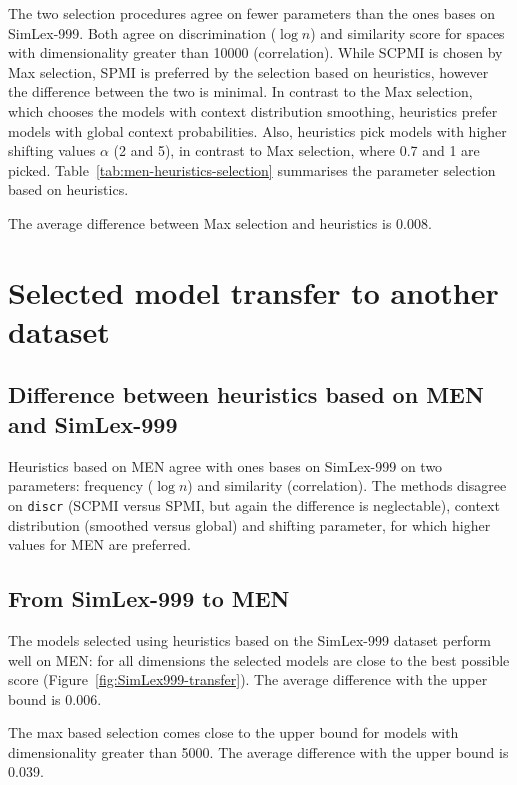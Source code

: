 The two selection procedures agree on fewer parameters than the ones bases on SimLex-999. Both agree on discrimination ($\log n$) and similarity score for spaces with dimensionality greater than 10000 (correlation). While SCPMI is chosen by Max selection, SPMI is preferred by the selection based on heuristics, however the difference between the two is minimal. In contrast to the Max selection, which chooses the models with context distribution smoothing, heuristics prefer models with global context probabilities. Also, heuristics pick models with higher shifting values $\alpha$ (2 and 5), in contrast to Max selection, where 0.7 and 1 are picked. Table~\ref{tab:men-heuristics-selection} summarises the parameter selection based on heuristics.

The average difference between Max selection and heuristics is 0.008.

\section{Selected model transfer to another dataset}
\label{sec:select-model-transf}

\subsection{Difference between heuristics based on MEN and SimLex-999}

Heuristics based on MEN agree with ones bases on SimLex-999 on two parameters: frequency ($\log n$) and similarity (correlation). The methods disagree on \texttt{discr} (SCPMI versus SPMI, but again the difference is neglectable), context distribution (smoothed versus global) and shifting parameter, for which higher values for MEN are preferred.

\subsection{From SimLex-999 to MEN}



The models selected using heuristics based on the SimLex-999 dataset perform well on MEN: for all dimensions the selected models are close to the best possible score (Figure~\ref{fig:SimLex999-transfer}). The average difference with the upper bound is 0.006.

The max based selection comes close to the upper bound for models with dimensionality greater than 5000. The average difference with the upper bound is 0.039.

